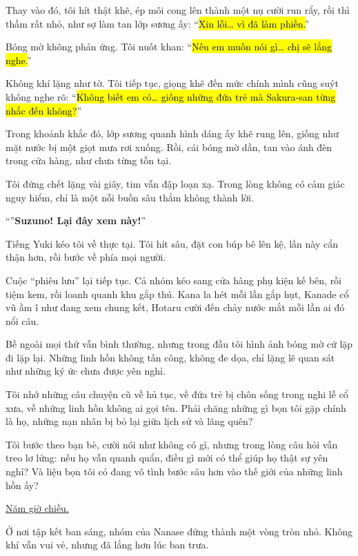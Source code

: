 \documentclass[../main.tex]{subfiles}
\begin{document}
Thay vào đó, tôi hít thật khẽ, ép môi cong lên thành một nụ cười run rẩy, rồi thì thầm rất nhỏ, như sợ làm tan lớp sương ấy: ``\hl{Xin lỗi\dots{} vì đã làm phiền.}''

Bóng mờ không phản ứng. Tôi nuốt khan: ``\hl{Nếu em muốn nói gì\dots{} chị sẽ lắng nghe.}''

Không khí lặng như tờ. Tôi tiếp tục, giọng khẽ đến mức chính mình cũng suýt không nghe rõ: ``\hl{Không biết em có\dots{} giống những đứa trẻ mà Sakura-san từng nhắc đến không?}''

Trong khoảnh khắc đó, lớp sương quanh hình dáng ấy khẽ rung lên, giống như mặt nước bị một giọt mưa rơi xuống. Rồi, cái bóng mờ dần, tan vào ánh đèn trong cửa hàng, như chưa từng tồn tại.

Tôi đứng chết lặng vài giây, tim vẫn đập loạn xạ. Trong lòng không có cảm giác nguy hiểm, chỉ là một nỗi buồn sâu thẳm không thành lời.

``''\textbf{Suzuno! Lại đây xem này!}''

Tiếng Yuki kéo tôi về thực tại. Tôi hít sâu, đặt con búp bê lên kệ, lần này cẩn thận hơn, rồi bước về phía mọi người.

Cuộc ``phiêu lưu'' lại tiếp tục. Cả nhóm kéo sang cửa hàng phụ kiện kế bên, rồi tiệm kem, rồi loanh quanh khu gắp thú. Kana la hét mỗi lần gắp hụt, Kanade cổ vũ ầm ĩ như đang xem chung kết, Hotaru cười đến chảy nước mắt mỗi lần ai đó nổi cáu.

Bề ngoài mọi thứ vẫn bình thường, nhưng trong đầu tôi hình ảnh bóng mờ cứ lặp đi lặp lại. Những linh hồn không tấn công, không đe dọa, chỉ lặng lẽ quan sát như những ký ức chưa được yên nghỉ.

Tôi nhớ những câu chuyện cũ về hủ tục, về đứa trẻ bị chôn sống trong nghi lễ cổ xưa, về những linh hồn không ai gọi tên. Phải chăng những gì bọn tôi gặp chính là họ, những nạn nhân bị bỏ lại giữa lịch sử và lãng quên?

Tôi bước theo bạn bè, cười nói như không có gì, nhưng trong lòng câu hỏi vẫn treo lơ lửng: nếu họ vẫn quanh quẩn, điều gì mới có thể giúp họ thật sự yên nghỉ? Và liệu bọn tôi có đang vô tình bước sâu hơn vào thế giới của những linh hồn ấy?

\begin{center}
  \pov{-}
  \uline{Năm giờ chiều.}
\end{center}

Ở nơi tập kết ban sáng, nhóm của Nanase đứng thành một vòng tròn nhỏ. Không khí vẫn vui vẻ, nhưng đã lắng hơn lúc ban trưa.
\end{document}
